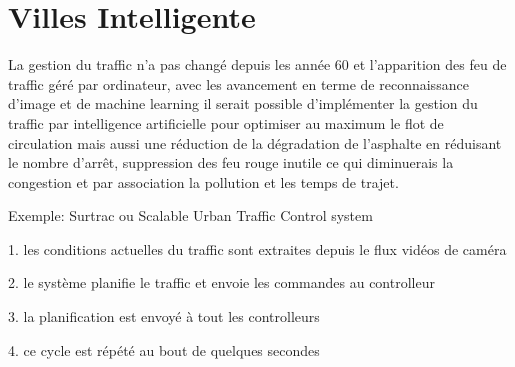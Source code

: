     \section{Villes Intelligente}
    La gestion du traffic n'a pas changé depuis les année 60 
    et l'apparition des feu de traffic géré par ordinateur, avec 
    les avancement en terme de reconnaissance d'image et de machine learning 
    il serait possible d'implémenter la gestion du traffic par intelligence 
    artificielle pour optimiser au maximum le flot de circulation 
    mais aussi une réduction de la dégradation de l'asphalte en réduisant le 
    nombre d'arrêt, suppression des feu rouge inutile ce qui diminuerais 
    la congestion et par association la pollution et les temps de trajet. \newline
    
    Exemple: Surtrac ou Scalable Urban Traffic Control system

    
    1. les conditions actuelles du traffic sont extraites 
    depuis le flux vidéos de caméra 

    2. le système planifie le traffic et envoie les commandes au controlleur 

    3. la planification est envoyé à tout les controlleurs 

    4. ce cycle est répété au bout de quelques secondes 